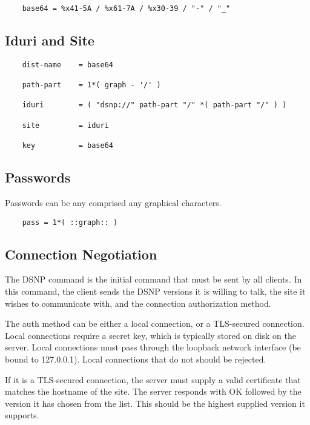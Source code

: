 \documentclass[letterpaper,11pt,oneside]{article}
\begin{document}
\vspace{10pt}
\begin{verbatim}
    base64 = %x41-5A / %x61-7A / %x30-39 / "-" / "_"
\end{verbatim}
\vspace{10pt}

\subsection{Iduri and Site}

\vspace{10pt}
\begin{verbatim}
    dist-name    = base64

    path-part    = 1*( graph - '/' )

    iduri        = ( "dsnp://" path-part "/" *( path-part "/" ) )

    site         = iduri

    key          = base64
\end{verbatim}

\subsection{Passwords}

Passwords can be any comprised any graphical characters.

\vspace{10pt}
\begin{verbatim}
    pass = 1*( ::graph:: )
\end{verbatim}
\vspace{10pt}

\subsection{Connection Negotiation}

The DSNP command is the initial command that must be sent by all clients. In
this command, the client sends the DSNP versions it is willing to talk, the
site it wishes to communicate with, and the connection authorization method.

The auth method can be either a local connection, or a TLS-secured connection.
Local connections require a secret key, which is typically stored on disk on
the server. Local connections must pass through the loopback network interface
(be bound to 127.0.0.1). Local connections that do not should be rejected.

If it is a TLS-secured connection, the server must supply a valid certificate
that matches the hostname of the site. The server responds with OK followed by
the version it has chosen from the list. This should be the highest supplied
version it supports.
\end{document}
